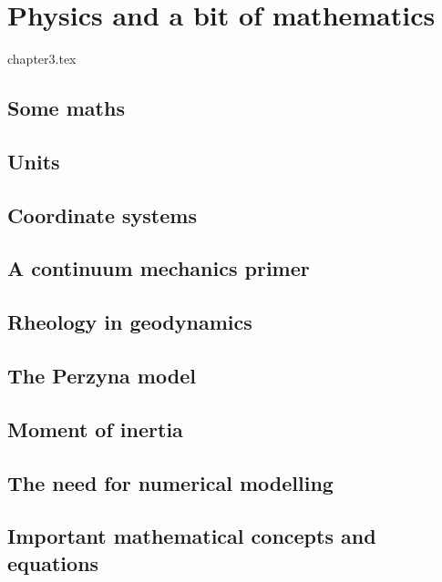 
\chapter{Physics and a bit of mathematics} \label{chapt3} %

\begin{flushright} {\tiny {\color{gray} chapter3.tex}} \end{flushright}

\section{Some maths} 
\section{Units}  %
\section{Coordinate systems}  \label{ss:coordsys} %
\section{A continuum mechanics primer} %
\newpage
\section{Rheology in geodynamics}  %


\newpage
\section{The Perzyna model}\label{sec:perzyna}


\newpage
\section{Moment of inertia}  %
\section{The need for numerical modelling} %
\newpage
\section{Important mathematical concepts and equations}  \label{ss:maths} %
